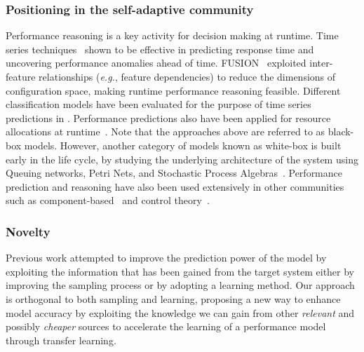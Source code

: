 \subsubsection{Positioning in the self-adaptive community}
Performance reasoning is a key activity for decision making at runtime. Time series techniques~\cite{ehlers2011self} shown to be effective in predicting response time and uncovering performance anomalies ahead of time. FUSION~\cite{esfahani2013learning,elkhodary2010fusion} exploited inter-feature relationships (\emph{e.g.}, feature dependencies) to reduce the dimensions of configuration space, making runtime performance reasoning feasible. Different classification models have been evaluated for the purpose of time series predictions in \cite{anaya2014prediction}.
Performance predictions also have been applied for resource allocations at runtime~\cite{huber2017model,jamshidi2016managing}.
Note that the approaches above are referred to as black-box models. However, another category of models known as white-box is built early in the life cycle, by studying the underlying architecture of the system \cite{gomaa2007model,happe2011facilitating} using Queuing networks, Petri Nets, and Stochastic Process Algebras~\cite{balsamo2004model}.
Performance prediction and reasoning have also been used extensively in other communities such as component-based~\cite{becker2006performance} and control theory~\cite{filieri2015automated}.

\subsubsection{Novelty}
Previous work attempted to improve the prediction power of the model by exploiting the information that has been gained from the target system either by improving the sampling process or by adopting a learning method.
Our approach is orthogonal to both sampling and learning, proposing a new way to enhance model accuracy by exploiting the knowledge we can gain from other \emph{relevant} and possibly \emph{cheaper} sources to accelerate the learning of a performance model through transfer learning.


